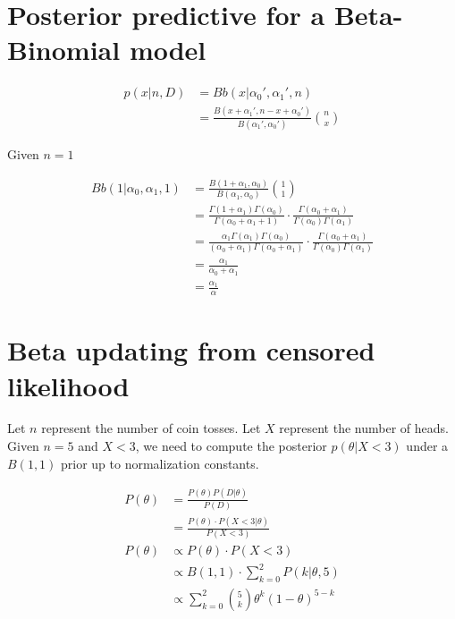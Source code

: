 \documentclass{article}
\begin{document}
\section{Posterior predictive for a Beta-Binomial model}

\begin{align*}
  p(x|n,D) &= Bb(x|\alpha_0', \alpha_1', n) \\
  &= \frac{B(x + \alpha_1', n-x+\alpha_0')}{B(\alpha_1',\alpha_0')} {n
    \choose x}
\end{align*}

Given $n = 1$

\begin{align*}
  Bb(1|\alpha_0,\alpha_1,1) &= \frac{B(1 + \alpha_1,
                              \alpha_0)}{B(\alpha_1, \alpha_0)} {1
                              \choose 1} \\
                            &= \frac{\Gamma(1 + \alpha_1)
                              \Gamma(\alpha_0)}{\Gamma(\alpha_0 +
                              \alpha_1 + 1)} \cdot
                              \frac{\Gamma(\alpha_0 +
                              \alpha_1)}{\Gamma(\alpha_0)\Gamma(\alpha_1)}
  \\
                            &= \frac{\alpha_1 \Gamma(\alpha_1)
                              \Gamma(\alpha_0)}{(\alpha_0 + \alpha_1)
                              \Gamma(\alpha_0 + \alpha_1)} \cdot
                              \frac{\Gamma(\alpha_0 +
                              \alpha_1)}{\Gamma(\alpha_0)\Gamma(\alpha_1)}
  \\
                            &= \frac{\alpha_1}{\alpha_0 + \alpha_1} \\
                            &= \frac{\alpha_1}{\alpha}
\end{align*}

\section{Beta updating from censored likelihood}

Let $n$ represent the number of coin tosses. Let $X$ represent the
number of heads. Given $n = 5$ and $X < 3$, we need to compute the
posterior $p(\theta| X < 3)$ under a $B(1,1)$ prior up to
normalization constants.

\begin{align*}
  P(\theta) &= \frac{P(\theta)P(D|\theta)}{P(D)} \\
            &= \frac{P(\theta) \cdot P(X<3|\theta)}{P(X < 3)} \\
  P(\theta) &\propto P(\theta) \cdot P(X<3) \\
            &\propto B(1,1) \cdot \sum_{k=0}^2 P(k|\theta,5) \\
            &\propto \sum_{k=0}^2 {5 \choose k} \theta^k
              (1-\theta)^{5-k} \\
\end{align*}
\end{document}
